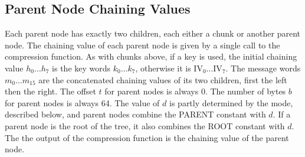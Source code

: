 \documentclass[11pt,notitlepage,a4paper]{article}
\newcommand{\IV}{\text{IV}}
\begin{document}
\subsection{Parent Node Chaining Values}\label{sec:chunk}

Each parent node has exactly two children, each either a chunk or another
parent node. The chaining value of each parent node is given by a single call
to the compression function. As with chunks above, if a key is used, the
initial chaining value $h_{0} \ldots h_{7}$ is the key words $k_{0} \ldots
k_{7}$, otherwise it is $\IV_{0} \ldots \IV_{7}$. The message words $m_{0}
\ldots m_{15}$ are the concatenated chaining values of its two children, first
the left then the right. The offset $t$ for parent nodes is always 0. The
number of bytes $b$ for parent nodes is always 64. The value of $d$ is partly
determined by the mode, described below, and parent nodes combine the PARENT
constant with $d$. If a parent node is the root of the tree, it also combines
the ROOT constant with $d$. The the output of the compression function is the
chaining value of the parent node.

\nocite{*}


\end{document}
